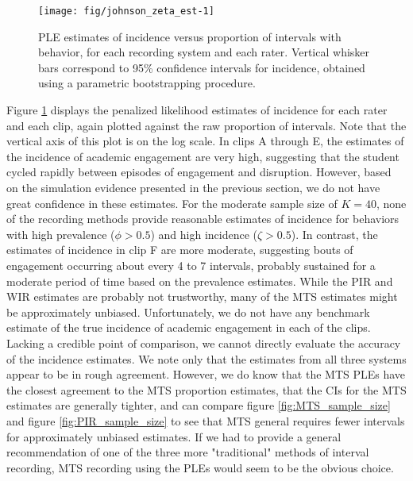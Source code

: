\documentclass[man, noextraspace, floatsintext]{apa6}\usepackage[]{graphicx}\usepackage[]{color}
\newenvironment{knitrout}{}{} %
\begin{document}
\begin{knitrout}
\color{fgcolor}\begin{figure}[tb]

{\centering \texttt{[image: fig/johnson\_zeta\_est-1]} 

}

\caption[PLE estimates of incidence versus proportion of intervals with behavior, for each recording system and each rater]{PLE estimates of incidence versus proportion of intervals with behavior, for each recording system and each rater. Vertical whisker bars correspond to 95\% confidence intervals for incidence, obtained using a parametric bootstrapping procedure.}\label{fig:johnson_zeta_est}
\end{figure}


\end{knitrout}

Figure \ref{fig:johnson_zeta_est} displays the penalized likelihood estimates of incidence for each rater and each clip, again plotted against the raw proportion of intervals. Note that the vertical axis of this plot is on the log scale. 
In clips A through E, the estimates of the incidence of academic engagement are very high, suggesting that the student cycled rapidly between episodes of engagement and disruption.
However, based on the simulation evidence presented in the previous section, we do not have great confidence in these estimates.
For the moderate sample size of $K = 40$, none of the recording methods provide reasonable estimates of incidence for behaviors with high prevalence ($\phi > 0.5$) and high incidence ($\zeta > 0.5$). In contrast, the estimates of incidence in clip F are more moderate, suggesting bouts of engagement occurring about every 4 to 7 intervals, probably sustained for a moderate period of time based on the prevalence estimates. While the PIR and WIR estimates are probably not trustworthy, many of the MTS estimates might be approximately unbiased.
Unfortunately, we do not have any benchmark estimate of the true incidence of academic engagement in each of the clips. 
Lacking a credible point of comparison, we cannot directly evaluate the accuracy of the incidence estimates. 
We note only that the estimates from all three systems appear to be in rough agreement. However, we do know that the MTS PLEs have the closest agreement to the MTS proportion estimates, that the CIs for the MTS estimates are generally tighter, and can compare figure \ref{fig:MTS_sample_size} and figure \ref{fig:PIR_sample_size} to see that MTS general requires fewer intervals for approximately unbiased estimates. If we had to provide a general recommendation of one of the three more "traditional" methods of interval recording, MTS recording using the PLEs would seem to be the obvious choice. 
\end{document}
